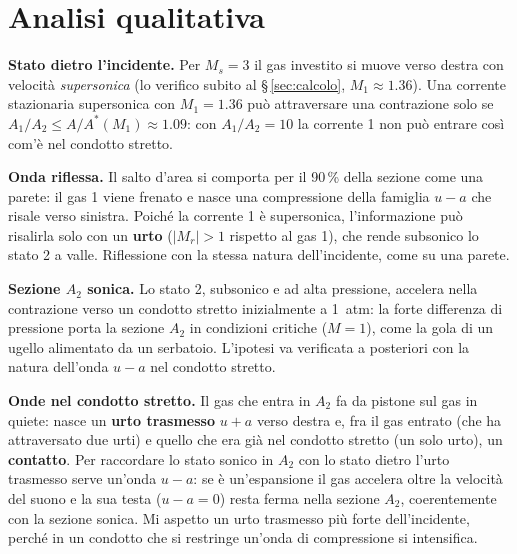 \documentclass[11pt,a4paper]{article}
\newcommand{\uma}{u-a}
\newcommand{\upa}{u+a}
\newcommand{\Mr}{M_{r}}
\begin{document}
\section{Analisi qualitativa}
\textbf{Stato dietro l'incidente.} Per $M_s=3$ il gas investito si muove verso destra con velocità
\emph{supersonica} (lo verifico subito al \S\,\ref{sec:calcolo}, $M_1\approx\num{1.36}$). Una corrente
stazionaria supersonica con $M_1=\num{1.36}$ può attraversare una contrazione solo se $A_1/A_2\le A/A^*(M_1)
\approx\num{1.09}$: con $A_1/A_2=10$ la corrente 1 non può entrare così com'è nel condotto stretto.

\textbf{Onda riflessa.} Il salto d'area si comporta per il 90\,\% della sezione come una parete: il gas 1
viene frenato e nasce una compressione della famiglia $\uma$ che risale verso sinistra. Poiché la corrente 1
è supersonica, l'informazione può risalirla solo con un \textbf{urto} ($|\Mr|>1$ rispetto al gas 1), che
rende subsonico lo stato 2 a valle. Riflessione con la stessa natura dell'incidente, come su una parete.

\textbf{Sezione $A_2$ sonica.} Lo stato 2, subsonico e ad alta pressione, accelera nella contrazione verso un
condotto stretto inizialmente a \SI{1}{atm}: la forte differenza di pressione porta la sezione $A_2$ in
condizioni critiche ($M=1$), come la gola di un ugello alimentato da un serbatoio. L'ipotesi va verificata a
posteriori con la natura dell'onda $\uma$ nel condotto stretto.

\textbf{Onde nel condotto stretto.} Il gas che entra in $A_2$ fa da pistone sul gas in quiete: nasce un
\textbf{urto trasmesso} $\upa$ verso destra e, fra il gas entrato (che ha attraversato due urti) e quello che
era già nel condotto stretto (un solo urto), un \textbf{contatto}. Per raccordare lo stato sonico in $A_2$
con lo stato dietro l'urto trasmesso serve un'onda $\uma$: se è un'espansione il gas accelera oltre la
velocità del suono e la sua testa ($u-a=0$) resta ferma nella sezione $A_2$, coerentemente con la sezione
sonica. Mi aspetto un urto trasmesso più forte dell'incidente, perché in un condotto che si restringe
un'onda di compressione si intensifica.

\end{document}

